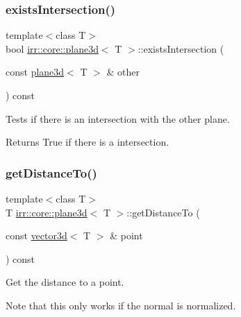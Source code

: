 \subsubsection{\texorpdfstring{exists\+Intersection()}{existsIntersection()}\hspace{0.1cm}{\footnotesize\ttfamily [2/2]}}
{\footnotesize\ttfamily template$<$class T$>$ \\
bool \hyperlink{classirr_1_1core_1_1plane3d}{irr\+::core\+::plane3d}$<$ T $>$\+::exists\+Intersection (\begin{DoxyParamCaption}\item[{const \hyperlink{classirr_1_1core_1_1plane3d}{plane3d}$<$ T $>$ \&}]{other }\end{DoxyParamCaption}) const\hspace{0.3cm}{\ttfamily [inline]}}



Tests if there is an intersection with the other plane. 

\begin{DoxyReturn}{Returns}
True if there is a intersection. 
\end{DoxyReturn}
\mbox{\label{classirr_1_1core_1_1plane3d_ab5e41d5843bf3bb856f543186b8a7df8}} 
\subsubsection{\texorpdfstring{get\+Distance\+To()}{getDistanceTo()}\hspace{0.1cm}{\footnotesize\ttfamily [1/2]}}
{\footnotesize\ttfamily template$<$class T$>$ \\
T \hyperlink{classirr_1_1core_1_1plane3d}{irr\+::core\+::plane3d}$<$ T $>$\+::get\+Distance\+To (\begin{DoxyParamCaption}\item[{const \hyperlink{classirr_1_1core_1_1vector3d}{vector3d}$<$ T $>$ \&}]{point }\end{DoxyParamCaption}) const\hspace{0.3cm}{\ttfamily [inline]}}



Get the distance to a point. 

Note that this only works if the normal is normalized. \mbox{\label{classirr_1_1core_1_1plane3d_ab5e41d5843bf3bb856f543186b8a7df8}} 
